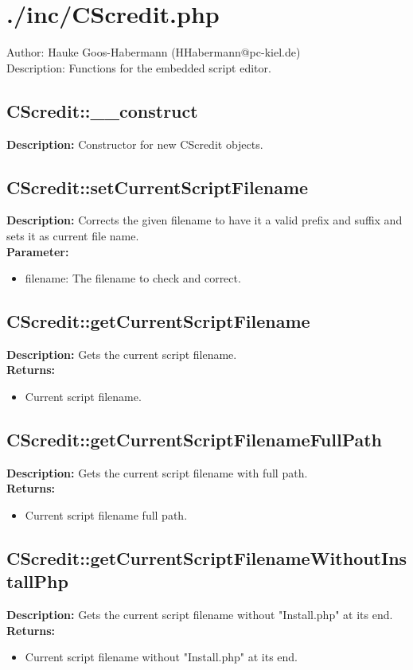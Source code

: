 \newpage\section{./inc/CScredit.php}
 Author: Hauke Goos-Habermann (HHabermann@pc-kiel.de)\\
 Description: Functions for the embedded script editor.\\

\subsection{CScredit::\_\_construct}
\textbf{Description:} Constructor for new CScredit objects.\\

\subsection{CScredit::setCurrentScriptFilename}
\textbf{Description:} Corrects the given filename to have it a valid prefix and suffix and sets it as current file name.\\
\textbf{Parameter:}
\begin{itemize}
\item filename: The filename to check and correct.
\end{itemize}

\subsection{CScredit::getCurrentScriptFilename}
\textbf{Description:} Gets the current script filename.\\
\textbf{Returns:}
\begin{itemize}
\item Current script filename.
\end{itemize}

\subsection{CScredit::getCurrentScriptFilenameFullPath}
\textbf{Description:} Gets the current script filename with full path.\\
\textbf{Returns:}
\begin{itemize}
\item Current script filename full path.
\end{itemize}

\subsection{CScredit::getCurrentScriptFilenameWithoutInstallPhp}
\textbf{Description:} Gets the current script filename without "Install.php" at its end.\\
\textbf{Returns:}
\begin{itemize}
\item Current script filename without "Install.php" at its end.
\end{itemize}

